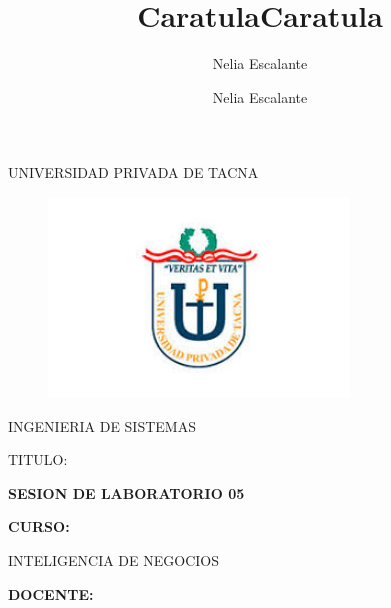 \documentclass[12pt,letterpaper]{article}
\author{Nelia Escalante}
\title{Caratula}
\begin{document}
\author{Nelia Escalante}
\title{Caratula}

\begin{titlepage}
\begin{center}
\large{UNIVERSIDAD PRIVADA DE TACNA}\\
\vspace*{-0.025in}
\begin{figure}[htb]
\begin{center}
\includegraphics[width=8cm]{./IMG/logo}
\end{center}
\end{figure}
\vspace*{0.15in}
INGENIERIA DE SISTEMAS  \\

\vspace*{0.5in}
\begin{large}
TITULO:\\
\end{large}

\vspace*{0.1in}
\begin{Large}
\textbf{SESION DE LABORATORIO 05} \\
\end{Large}

\vspace*{0.3in}
\begin{Large}
\textbf{CURSO:} \\
\end{Large}

\vspace*{0.1in}
\begin{large}
INTELIGENCIA DE NEGOCIOS\\
\end{large}

\vspace*{0.3in}
\begin{Large}
\textbf{DOCENTE:} \\
\end{Large}


\end{center}
\end{titlepage}
\end{document}
